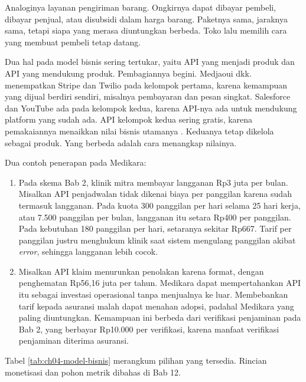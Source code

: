 Analoginya layanan pengiriman barang. Ongkirnya dapat dibayar pembeli, dibayar penjual, atau disubsidi
dalam harga barang. Paketnya sama, jaraknya sama, tetapi siapa yang merasa diuntungkan berbeda. Toko lalu
memilih cara yang membuat pembeli tetap datang.

Dua hal pada model bisnis sering tertukar, yaitu API yang menjadi produk dan API yang mendukung produk.
Pembagiannya begini. Medjaoui dkk. menempatkan Stripe dan Twilio pada kelompok pertama, karena kemampuan
yang dijual berdiri sendiri, misalnya pembayaran dan pesan singkat. Salesforce dan YouTube ada pada
kelompok kedua, karena API-nya ada untuk mendukung platform yang sudah ada. API kelompok kedua sering gratis,
karena pemakaiannya menaikkan nilai bisnis utamanya \cite{medjaoui2021continuous}. Keduanya tetap
dikelola sebagai produk. Yang berbeda adalah cara menangkap nilainya.

Dua contoh penerapan pada Medikara:
\begin{enumerate}
  \item Pada skema Bab 2, klinik mitra membayar langganan Rp3 juta per bulan. Misalkan API penjadwalan tidak
        dikenai biaya per panggilan karena sudah termasuk langganan. Pada kuota 300 panggilan per hari
        selama 25 hari kerja, atau 7.500 panggilan per bulan, langganan itu setara Rp400 per panggilan.
        Pada kebutuhan 180 panggilan per hari, setaranya sekitar Rp667. Tarif per panggilan justru menghukum klinik saat sistem
        mengulang panggilan akibat \textit{error}, sehingga langganan lebih cocok.
  \item Misalkan API klaim menurunkan penolakan karena format, dengan penghematan Rp56,16 juta per tahun.
        Medikara dapat mempertahankan API itu sebagai investasi operasional tanpa menjualnya ke luar.
        Membebankan tarif kepada asuransi malah dapat menahan adopsi, padahal Medikara yang paling
        diuntungkan. Kemampuan ini berbeda dari verifikasi penjaminan pada Bab 2, yang berbayar
        Rp10.000 per verifikasi, karena manfaat verifikasi penjaminan diterima asuransi.
\end{enumerate}

Tabel \ref{tab:ch04-model-bisnis} merangkum pilihan yang tersedia. Rincian monetisasi dan pohon metrik dibahas
di Bab 12.

